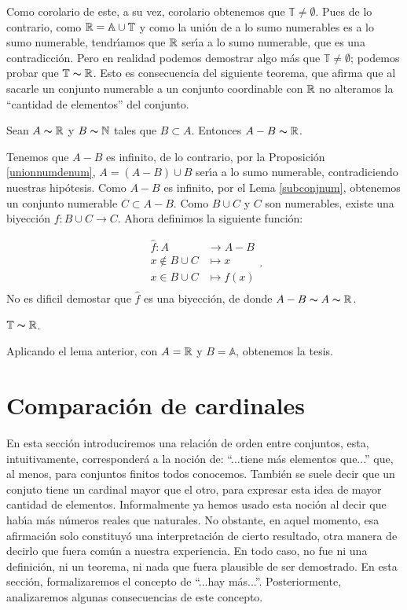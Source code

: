 Como corolario de este, a su vez, corolario obtenemos que
$\mathbb{T}\neq\emptyset$. Pues de lo contrario, como
$\rr=\mathbb{A}\cup\mathbb{T}$ y como la uni\'on de a lo sumo
numerables es a lo sumo numerable, tendr\'{\i}amos que $\rr$
ser\'{\i}a a lo sumo numerable, que es una contradicci\'on. Pero
en realidad podemos demostrar algo m\'as que
$\mathbb{T}\neq\emptyset$; podemos probar que
$\mathbb{T}\thicksim\rr$. Esto es consecuencia del siguiente
teorema, que afirma que al sacarle un conjunto numerable a un
conjunto coordinable con $\rr$ no alteramos la ``cantidad de
elementos'' del conjunto.
\begin{lema} Sean $A\thicksim\rr$ y $B\thicksim\nn$ tales que
$B\subset A$. Entonces $A-B\thicksim\rr$.
\end{lema}
\begin{demo} Tenemos que $A-B$ es infinito, de lo contrario, por la
Proposici\'on \vref{unionnumdenum}, $A=(A-B)\cup B$ ser\'{\i}a a
lo sumo numerable, contradiciendo nuestras hip\'otesis. Como $A-B$
es infinito, por el Lema \vref{subconjnum}, obtenemos un conjunto
numerable $C\subset A-B$. Como $B\cup C$ y $C$ son numerables,
existe una biyecci\'on $f:B\cup C\longrightarrow C$. Ahora
definimos la siguiente funci\'on:

\[
  \begin{split}
       \hat{f}:A&\longrightarrow A-B\\
       x\notin B\cup C&\longmapsto x\\
       x\in B\cup C&\longmapsto f(x)\\
  \end{split}.
\]
No es dificil demostar que $\hat{f}$ es una biyecci\'on, de donde
$A-B\thicksim A\thicksim\rr$.
\end{demo}

\begin{corolario} $\mathbb{T}\thicksim\rr$.
\end{corolario}
\begin{demo} Aplicando el lema anterior, con $A=\rr$ y
$B=\mathbb{A}$, obtenemos la tesis.
\end{demo}

\section{Comparaci\'on de cardinales}
En esta secci\'on introduciremos una relaci\'on de orden entre
conjuntos, esta, intuitivamente, corresponder\'a a la noci\'on de:
``...tiene m\'as elementos que...'' que, al menos, para conjuntos
finitos todos conocemos. Tambi\'en se suele decir que un conjuto
tiene un cardinal mayor que el otro, para expresar esta idea de
mayor cantidad de elementos. Informalmente ya hemos usado esta
noci\'on al decir que hab\'{\i}a m\'as n\'umeros reales que
naturales. No obstante, en aquel momento, esa afirmaci\'on solo
constituy\'o una interpretaci\'on de cierto resultado, otra manera
de decirlo que fuera com\'un a nuestra experiencia. En todo caso,
no fue ni una definici\'on, ni un teorema, ni nada que fuera
plausible de ser demostrado. En esta secci\'on,  formalizaremos el
concepto de ``...hay m\'as...''. Posteriormente, analizaremos
algunas consecuencias de este concepto.

